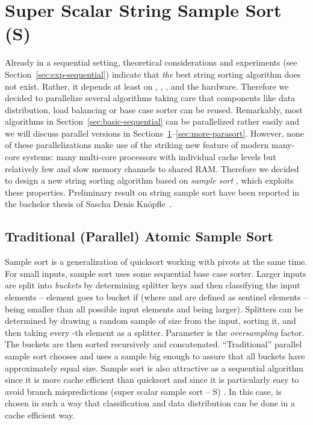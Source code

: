 \documentclass[a4paper]{myjournal}
\begin{document}
\section{Super Scalar String Sample Sort (\texorpdfstring{S}{S5})}\label{sec:s5}

Already in a sequential setting, theoretical considerations and experiments (see
Section~\ref{sec:exp-sequential}) indicate that \emph{the} best string sorting
algorithm does not exist.  Rather, it depends at least on , , ,
and the hardware.  Therefore we decided to parallelize several algorithms taking
care that components like data distribution, load balancing or base case sorter
can be reused.  Remarkably, most algorithms in
Section~\ref{sec:basic-sequential} can be parallelized rather easily and we will
discuss parallel versions in
Sections~\ref{sec:s5}--\ref{sec:more-parasort}. However, none of these
parallelizations make use of the striking new feature of modern many-core
systems: many multi-core processors with individual cache levels but relatively
few and slow memory channels to shared RAM. Therefore we decided to design a new
string sorting algorithm based on \emph{sample sort}
\cite{frazer1970samplesort}, which exploits these properties.  Preliminary
result on string sample sort have been reported in the bachelor thesis of Sascha
Denis Knöpfle~\cite{knoepfle2012string}.

\subsection{Traditional (Parallel) Atomic Sample Sort}\label{sec:ss-atomic}

Sample sort \cite{frazer1970samplesort,blelloch1991comparison} is a generalization of quicksort working
with  pivots at the same time.  For small inputs, sample sort uses some
sequential base case sorter.  Larger inputs are split into  \emph{buckets}
 by determining  splitter keys 
and then classifying the input elements -- element  goes to bucket  if
 (where  and  are defined as sentinel elements --
 being smaller than all possible input elements and  being larger).
Splitters can be determined by drawing a random sample of size  from
the input, sorting it, and then taking every -th element as a
splitter. Parameter  is the \emph{oversampling} factor. The buckets are
then sorted recursively and concatenated. ``Traditional'' parallel sample sort
chooses  and uses a sample big enough to assure that all buckets have
approximately equal size.  Sample sort is also attractive as a sequential
algorithm since it is more cache efficient than quicksort and since it is
particularly easy to avoid branch mispredictions (super scalar sample sort --
S) \cite{sanders2004super}. In this case,  is chosen in such a way that
classification and data distribution can be done in a cache efficient way.
\end{document}
